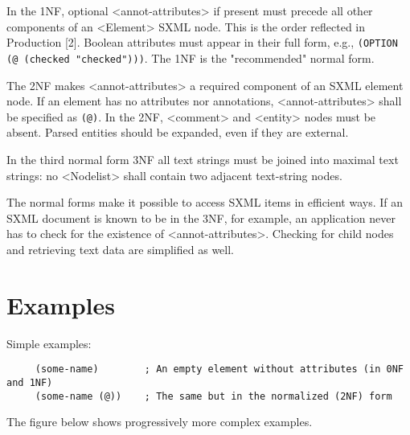 \documentclass[10pt]{article}
\begin{document}
In the 1NF, optional <annot-attributes> if
present must precede all other components of an <Element> SXML node. This is the order reflected in Production [2].  Boolean
attributes must appear in their full form, e.g., \texttt{(OPTION (@
 (checked "checked")))}. The 1NF is the "recommended" normal
form.

The 2NF makes <annot-attributes> a required
component of an SXML element node. If an element has no attributes nor annotations, <annot-attributes> shall be specified as \texttt{(@)}. In the 2NF, <comment> and <entity> nodes must be absent. Parsed entities should be expanded, even if
they are external.

In the third normal form 3NF all text strings must be
joined into maximal text strings: no <Nodelist> shall
contain two adjacent text-string nodes.

The normal forms make it possible to access SXML items in
efficient ways. If an SXML document is known to be in the 3NF, for
example, an application never has to check for the existence of
 <annot-attributes>. Checking for child nodes and
retrieving text data are simplified as well.

\section{Examples}
Simple examples:\begin{verbatim}
     (some-name)        ; An empty element without attributes (in 0NF and 1NF)
     (some-name (@))    ; The same but in the normalized (2NF) form
\end{verbatim}


The figure below shows progressively more complex examples.
\end{document}
